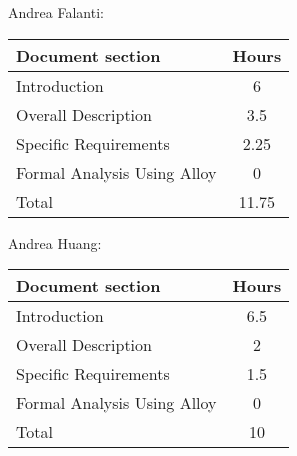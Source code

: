 Andrea Falanti:

\begin{tabular}{|l|c|}
    \hline
    Document section & Hours \\
    \hline
     Introduction & 6\\
     Overall Description & 3.5\\
     Specific Requirements & 2.25\\
     Formal Analysis Using Alloy & 0\\
     \hline
     Total & 11.75\\
     \hline
\end{tabular}
\vskip 0.3in

Andrea Huang:

\begin{tabular}{|l|c|}
    \hline
    Document section & Hours \\
    \hline
     Introduction &  6.5\\
     Overall Description & 2\\
     Specific Requirements & 1.5\\
     Formal Analysis Using Alloy & 0\\
     \hline
     Total & 10\\
     \hline
\end{tabular}